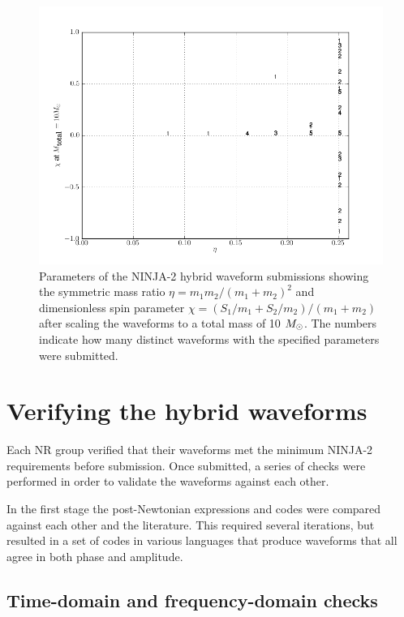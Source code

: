 \begin{figure}
  \includegraphics[width=\linewidth]{figures/ninja2/ninja2_cat.png}
  \caption[Parameters of the NINJA-2 submissions]{
  \label{f:ninja2_param_map}
Parameters of the NINJA-2 hybrid waveform submissions showing the
symmetric mass ratio $\eta=m_1 m_2 /(m_1+m_2)^2$ and dimensionless
spin parameter $\chi=(S_1/m_1 + S_2/m_2)/(m_1+m_2)$ after scaling the
waveforms to a total mass of 10 $M_\odot$.  The numbers indicate how
many distinct waveforms with the specified parameters were submitted.}
\end{figure}%

\section{Verifying the hybrid waveforms}

Each NR group verified that their waveforms met the minimum NINJA-2
requirements before submission.  Once submitted, a series of checks
were performed in order to validate the waveforms against each other.

In the first stage the post-Newtonian expressions and codes were
compared against each other and the literature.  This required several
iterations, but resulted in a set of codes in various languages that
produce waveforms that all agree in both phase and amplitude. 

\subsection{Time-domain and frequency-domain checks}

